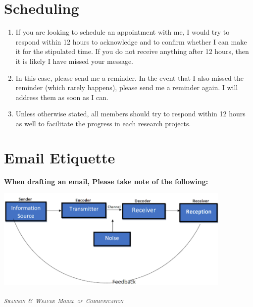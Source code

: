 \documentclass[
]{book}
\begin{document}
\hypertarget{scheduling}{%
\section{Scheduling}\label{scheduling}}

\begin{enumerate}
\def\labelenumi{\arabic{enumi}.}
\item
  If you are looking to schedule an appointment with me, I would try to respond within 12 hours to acknowledge and to confirm whether I can make it for the stipulated time. If you do not receive anything after 12 hours, then it is likely I have missed your message.
\item
  In this case, please send me a reminder. In the event that I also missed the reminder (which rarely happens), please send me a reminder again. I will address them as soon as I can.
\item
  Unless otherwise stated, all members should try to respond within 12 hours as well to facilitate the progress in each research projects.
\end{enumerate}

\hypertarget{email-etiquette}{%
\section{Email Etiquette}\label{email-etiquette}}

\textbf{When drafting an email, Please take note of the following:}

\includegraphics[width=4.51042in,height=\textheight]{communication_map.png}

\textsubscript{\textsc{\emph{Shannon~\&~Weaver~Model~of~Communication}}}
\end{document}
